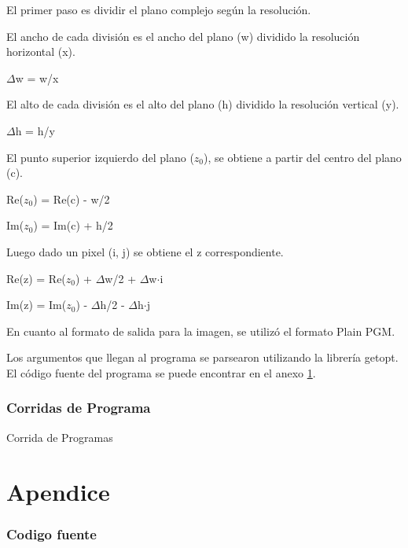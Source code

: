 \documentclass{article}
\begin{document}
El primer paso es dividir el plano complejo según la resolución. 

El ancho de cada división es el ancho del plano (w) dividido la resolución horizontal (x).

$\Delta$w = w/x

El alto de cada división es el alto del plano (h) dividido la resolución vertical (y).

$\Delta$h = h/y

El punto superior izquierdo del plano ($z_{0}$), se obtiene a partir del centro del plano (c).

Re($z_{0}$) = Re(c) - w/2

Im($z_{0}$) = Im(c) + h/2

Luego dado un pixel (i, j) se obtiene el z correspondiente.

Re(z) = Re($z_{0}$) + $\Delta$w/2 + $\Delta$w$\cdot$i

Im(z) = Im($z_{0}$) - $\Delta$h/2 - $\Delta$h$\cdot$j

En cuanto al formato de salida para la imagen, se utilizó el formato Plain PGM.

Los argumentos que llegan al programa se parsearon utilizando la librería getopt. 
El código fuente del programa se puede encontrar en el anexo \ref{sec:source}.

\section{Corridas de Programa}

Corrida de Programas



\clearpage

\part{Apendice}
\appendix


\section{Codigo fuente}\label{sec:source}




\end{document}
